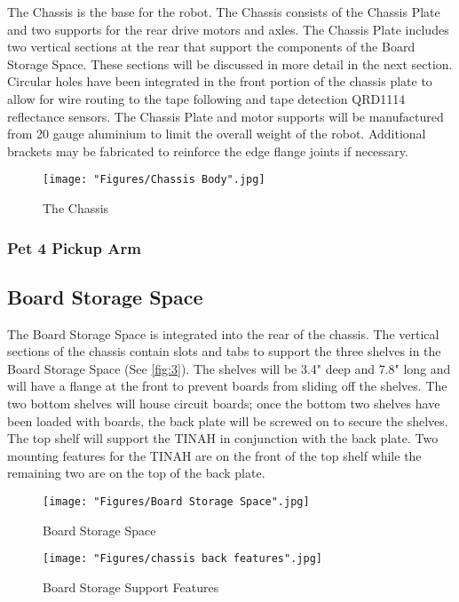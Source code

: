 \documentclass[11pt, oneside]{article} %
\begin{document}
	The Chassis is the base for the robot. The Chassis consists of the Chassis Plate and two supports for the rear drive motors and axles. The Chassis Plate includes two vertical sections at the rear that support the components of the Board Storage Space. These sections will be discussed in more detail in the next section. Circular holes have been integrated in the front portion of the chassis plate to allow for wire routing to the tape following and tape detection QRD1114 reflectance sensors. The Chassis Plate and motor supports will be manufactured from 20 gauge aluminium to limit the overall weight of the robot. Additional brackets may be fabricated to reinforce the edge flange joints if necessary. 

	\begin{figure}[h]
		\centering
		\texttt{[image: "Figures/Chassis Body".jpg]}
		\caption[Chassis]{The Chassis}
		\label{fig:1}
	\end{figure}

	\subsubsection{Pet 4 Pickup Arm}
	
	\subsection{Board Storage Space}

	The Board Storage Space is integrated into the rear of the chassis. The vertical sections of the chassis contain slots and tabs to support the three shelves in the Board Storage Space (See \autoref{fig:3}). The shelves will be 3.4" deep and 7.8" long and will have a flange at the front to prevent boards from sliding off the shelves. The two bottom shelves will house circuit boards; once the bottom two shelves have been loaded with boards, the back plate will be screwed on to secure the shelves. The top shelf will support the TINAH in conjunction with the back plate. Two mounting features for the TINAH are on the front of the top shelf while the remaining two are on the top of the back plate.

	\begin{figure}[h]
		\centering
		\texttt{[image: "Figures/Board Storage Space".jpg]}
		\caption[Board Storage Space]{Board Storage Space}
		\label{fig:2}
	\end{figure}

	\begin{figure}[h]
		\centering
		\texttt{[image: "Figures/chassis back features".jpg]}
		\caption[Board Storage Support Features]{Board Storage Support Features}
		\label{fig:3}
	\end{figure}
\end{document}
